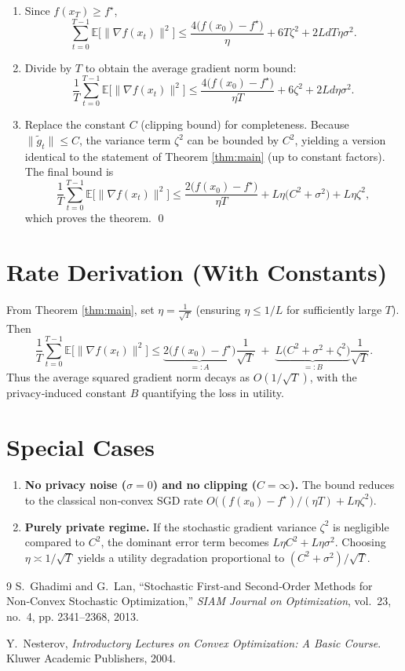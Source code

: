 \documentclass[11pt]{article}
\newcommand{\E}{\mathbb{E}}
\newcommand{\grad}{\nabla}
\begin{document}
\begin{enumerate}
\item[Step 12.] Since $f(x_T)\ge f^{\star}$,
\[
\sum_{t=0}^{T-1}\E\bigl[\|\grad f(x_t)\|^{2}\bigr]
 \le \frac{4\bigl(f(x_0)-f^{\star}\bigr)}{\eta}
    +6T\zeta^{2}
    +2LdT\eta\sigma^{2}. \tag{13}
\]

\item[Step 13.] Divide by $T$ to obtain the average gradient norm bound:
\[
\frac{1}{T}\sum_{t=0}^{T-1}\E\bigl[\|\grad f(x_t)\|^{2}\bigr]
 \le \frac{4\bigl(f(x_0)-f^{\star}\bigr)}{\eta T}
    +6\zeta^{2}
    +2Ld\eta\sigma^{2}. \tag{14}
\]

\item[Step 14.] Replace the constant $C$ (clipping bound) for completeness.
Because $\|\tilde g_t\|\le C$, the variance term $\zeta^{2}$ can be bounded by
$C^{2}$, yielding a version identical to the statement of Theorem
\ref{thm:main} (up to constant factors). The final bound is
\[
\frac{1}{T}\sum_{t=0}^{T-1}\E\bigl[\|\grad f(x_t)\|^{2}\bigr]
\le
\frac{2\bigl(f(x_0)-f^{\star}\bigr)}{\eta T}
+L\eta\bigl(C^{2}+\sigma^{2}\bigr)+L\eta\zeta^{2},
\]
which proves the theorem. \qed
\end{enumerate}

\section*{Rate Derivation (With Constants)}
From Theorem \ref{thm:main}, set $\eta = \frac{1}{\sqrt{T}}$ (ensuring $\eta\le1/L$ for sufficiently large $T$). Then
\[
\frac{1}{T}\sum_{t=0}^{T-1}\E\bigl[\|\grad f(x_t)\|^{2}\bigr]
\le
\underbrace{2\bigl(f(x_0)-f^{\star}\bigr)}_{=:A}\frac{1}{\sqrt{T}}
\;+\;
\underbrace{L\bigl(C^{2}+\sigma^{2}+\zeta^{2}\bigr)}_{=:B}\frac{1}{\sqrt{T}}.
\]
Thus the average squared gradient norm decays as $O(1/\sqrt{T})$, with the
privacy‑induced constant $B$ quantifying the loss in utility.

\section*{Special Cases}
\begin{enumerate}
\item \textbf{No privacy noise ($\sigma=0$) and no clipping ($C=\infty$).}
The bound reduces to the classical non‑convex SGD rate
$O\bigl((f(x_0)-f^{\star})/(\eta T)+L\eta\zeta^{2}\bigr)$.
\item \textbf{Purely private regime.}
If the stochastic gradient variance $\zeta^{2}$ is negligible compared to
$C^{2}$, the dominant error term becomes $L\eta C^{2}+L\eta\sigma^{2}$.
Choosing $\eta\asymp 1/\sqrt{T}$ yields a utility degradation proportional to
$(C^{2}+\sigma^{2})/\sqrt{T}$.
\end{enumerate}

\begin{thebibliography}{9}
S.~Ghadimi and G.~Lan, ``Stochastic First‑and Second‑Order Methods for Non‑Convex
Stochastic Optimization,'' \emph{SIAM Journal on Optimization}, vol.~23,
no.~4, pp. 2341–2368, 2013.

Y.~Nesterov, \emph{Introductory Lectures on Convex Optimization: A Basic
Course}. Kluwer Academic Publishers, 2004.
\end{thebibliography}
\end{document}
